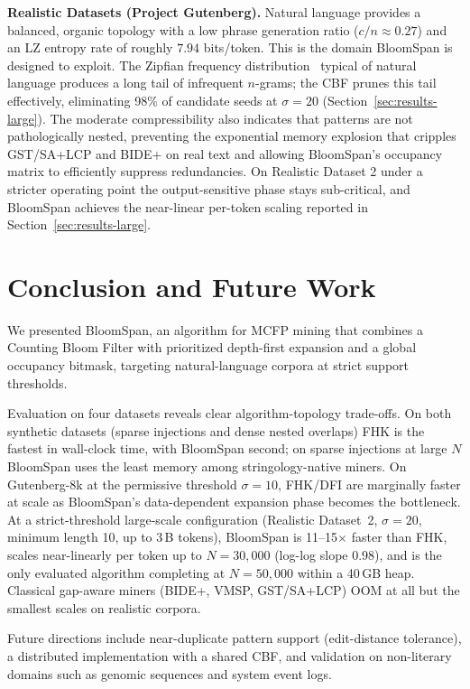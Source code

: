 \documentclass[runningheads]{llncs}
\begin{document}
    \textbf{Realistic Datasets (Project Gutenberg).} Natural language provides a balanced, organic topology with a low phrase generation ratio ($c/n \approx 0.27$) and an LZ entropy rate of roughly $7.94$ bits/token. This is the domain BloomSpan is designed to exploit. The Zipfian frequency distribution~\cite{zipf1949human} typical of natural language produces a long tail of infrequent $n$-grams; the CBF prunes this tail effectively, eliminating 98\% of candidate seeds at $\sigma = 20$ (Section~\ref{sec:results-large}). The moderate compressibility also indicates that patterns are not pathologically nested, preventing the exponential memory explosion that cripples GST/SA+LCP and BIDE+ on real text and allowing BloomSpan's occupancy matrix to efficiently suppress redundancies. On Realistic Dataset 2 under a stricter operating point the output-sensitive phase stays sub-critical, and BloomSpan achieves the near-linear per-token scaling reported in Section~\ref{sec:results-large}.

    \section{Conclusion and Future Work}

    We presented BloomSpan, an algorithm for MCFP mining that combines a Counting Bloom Filter with prioritized depth-first expansion and a global occupancy bitmask, targeting natural-language corpora at strict support thresholds.

    Evaluation on four datasets reveals clear algorithm-topology trade-offs. On both synthetic datasets (sparse injections and dense nested overlaps) FHK is the fastest in wall-clock time, with BloomSpan second; on sparse injections at large $N$ BloomSpan uses the least memory among stringology-native miners. On Gutenberg-8k at the permissive threshold $\sigma = 10$, FHK/DFI are marginally faster at scale as BloomSpan's data-dependent expansion phase becomes the bottleneck. At a strict-threshold large-scale configuration (Realistic Dataset~2, $\sigma = 20$, minimum length 10, up to 3\,B tokens), BloomSpan is 11--15$\times$ faster than FHK, scales near-linearly per token up to $N = 30{,}000$ (log-log slope 0.98), and is the only evaluated algorithm completing at $N = 50{,}000$ within a 40\,GB heap. Classical gap-aware miners (BIDE+, VMSP, GST/SA+LCP) OOM at all but the smallest scales on realistic corpora.

    Future directions include near-duplicate pattern support (edit-distance tolerance), a distributed implementation with a shared CBF, and validation on non-literary domains such as genomic sequences and system event logs.

    \small
    
    
\end{document}
